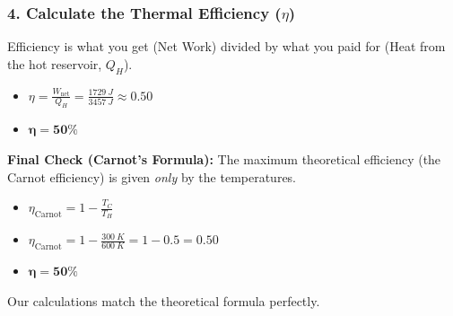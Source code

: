 \documentclass[article]{article}
\begin{document}
\subsubsection{4. Calculate the Thermal Efficiency ($\eta$)}
Efficiency is what you get (Net Work) divided by what you paid for (Heat from the hot reservoir, $Q_H$).
\begin{itemize}
    \item $\eta = \frac{W_{\text{net}}}{Q_H} = \frac{\SI{1729}{J}}{\SI{3457}{J}} \approx 0.50$
    \item $\mathbf{\eta = 50\%}$
\end{itemize}
\textbf{Final Check (Carnot's Formula):}
The maximum theoretical efficiency (the Carnot efficiency) is given \textit{only} by the temperatures.
\begin{itemize}
    \item $\eta_{\text{Carnot}} = 1 - \frac{T_C}{T_H}$
    \item $\eta_{\text{Carnot}} = 1 - \frac{\SI{300}{K}}{\SI{600}{K}} = 1 - 0.5 = 0.50$
    \item $\mathbf{\eta = 50\%}$
\end{itemize}
Our calculations match the theoretical formula perfectly.
\end{document}

